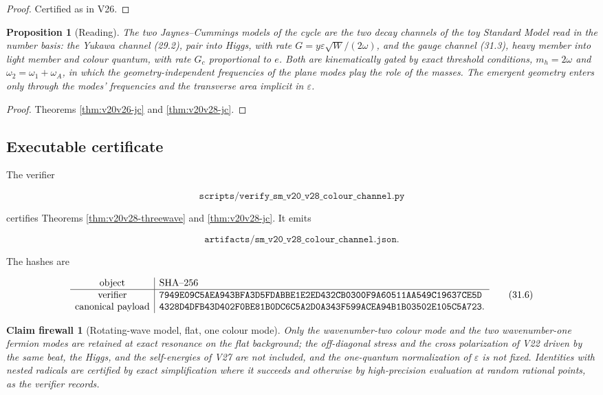 \documentclass[11pt]{article}
\newtheorem{proposition}[theorem]{Proposition}
\newtheorem{firewall}[theorem]{Claim firewall}
\theoremstyle{remark}
\begin{document}
\begin{proof}
Certified as in V26.
\end{proof}

\begin{proposition}[Reading]
\label{prop:v20v28-reading}
The two Jaynes--Cummings models of the cycle are the two decay
channels of the toy Standard Model read in the number basis: the
Yukawa channel (29.2), pair into Higgs, with rate
\(G=y\varepsilon\sqrt W/(2\omega)\), and the gauge channel (31.3), heavy
member into light member and colour quantum, with rate \(G_c\)
proportional to \(e\).  Both are kinematically gated by exact
threshold conditions, \(m_h=2\omega\) and \(\omega_2=\omega_1+\omega_A\),
in which the geometry-independent frequencies of the plane modes
play the role of the masses.  The emergent geometry enters only
through the modes' frequencies and the transverse area implicit in
\(\varepsilon\).
\end{proposition}

\begin{proof}
Theorems \ref{thm:v20v26-jc} and \ref{thm:v20v28-jc}.
\end{proof}

\subsection{Executable certificate}

The verifier

\[
 \texttt{scripts/verify\_sm\_v20\_v28\_colour\_channel.py}            \tag{31.4}
\]

certifies Theorems \ref{thm:v20v28-threewave} and
\ref{thm:v20v28-jc}.  It emits

\[
 \texttt{artifacts/sm\_v20\_v28\_colour\_channel.json}.               \tag{31.5}
\]

The hashes are

\[
\begin{array}{c|l}
\hbox{object}&\hbox{SHA--256}\\ \hline
\hbox{verifier}&
\texttt{7949E09C5AEA943BFA3D5FDABBE1E2ED432CB0300F9A60511AA549C19637CE5D}\\
\hbox{canonical payload}&
\texttt{4328D4DFB43D402F0BE81B0DC6C5A2D0A343F599ACEA94B1B03502E105C5A723}.
\end{array}                                                     \tag{31.6}
\]

\begin{firewall}[Rotating-wave model, flat, one colour mode]
\label{fire:v20v28}
Only the wavenumber-two colour mode and the two wavenumber-one
fermion modes are retained at exact resonance on the flat
background; the off-diagonal stress and the cross polarization of
V22 driven by the same beat, the Higgs, and the self-energies of V27
are not included, and the one-quantum normalization of
\(\varepsilon\) is not fixed.  Identities with nested radicals are
certified by exact simplification where it succeeds and otherwise by
high-precision evaluation at random rational points, as the verifier
records.
\end{firewall}
\end{document}
